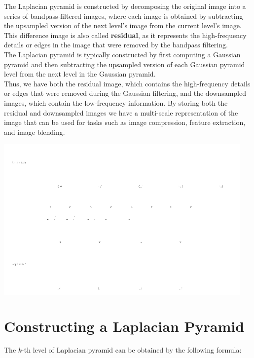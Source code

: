 \documentclass{article}
\begin{document}
The Laplacian pyramid is constructed by decomposing the original image into a series of bandpass-filtered images, where each image is obtained by subtracting the upsampled version of the next level's image from the current level's image. This difference image is also called \textbf{residual}, as it represents the high-frequency details or edges in the image that were removed by the bandpass filtering. \\

The Laplacian pyramid is typically constructed by first computing a Gaussian pyramid and then subtracting the upsampled version of each Gaussian pyramid level from the next level in the Gaussian pyramid. \\

Thus, we have both the residual image, which contains the high-frequency details or edges that were removed during the Gaussian filtering, and the downsampled images, which contain the low-frequency information. By storing both the residual and downsampled images we have a multi-scale representation of the image that can be used for tasks such as image compression, feature extraction, and image blending.

\begin{center}
\includegraphics[width=0.95\textwidth]{images/pyramids.png}
\end{center}

\newpage

\section*{Constructing a Laplacian Pyramid}

The $k$-th level of Laplacian pyramid can be obtained by the following formula:
\end{document}
